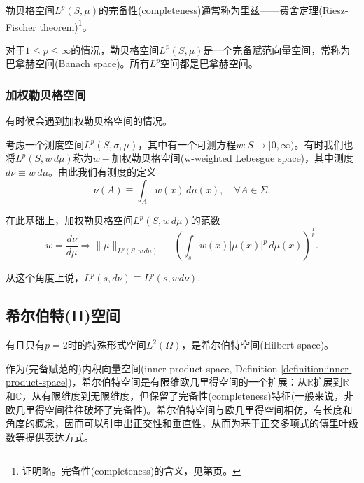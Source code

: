 勒贝格空间$L^{p}(S,\mu)$的完备性(completeness)通常称为里兹——费舍定理(Riesz-Fischer theorem)\footnote{证明略。完备性(completeness)的含义，见第\pageref{def:completeness-space}页。}。

对于$1 \le p \le \infty$的情况，勒贝格空间$L^{p}(S,\mu)$是一个完备赋范向量空间，常称为巴拿赫空间(Banach space)。所有$L^{p}$空间都是巴拿赫空间。

\subsubsection{加权勒贝格空间}
\label{sec:lp-weightd-lp}
有时候会遇到加权勒贝格空间的情况。

\begin{definition}[加权勒贝格空间]
  \label{definition:lp-weightd-lp}
  考虑一个测度空间$L^p \left( S, \sigma, \mu \right)$，其中有一个可测方程$w : S \rightarrow [ 0, \infty)$。有时我们也将$L^p \left(S, w \, d \mu \right)$称为$w-$加权勒贝格空间(w-weighted Lebesgue space)，其中测度$d \nu \equiv w \, d \mu$。由此我们有测度的定义
  \begin{equation*}
    \nu (A) \equiv \int_A w(x) \, d \mu(x), \quad \forall A \in \Sigma.
  \end{equation*}

在此基础上，加权勒贝格空间$L^p \left(S, w \, d \mu \right)$的范数
\begin{equation*}
  w = \frac{d \nu}{d \mu} \Rightarrow \Big\| \mu \Big\|_{L^p(S, w \, d\mu)} \equiv \left(
  \int_s w(x) \left| \mu(x) \right|^p \, d \mu(x)
  \right)^{\frac{1}{p}}.
\end{equation*}

从这个角度上说，$L^p (s, d \nu) \equiv L^p ( s, w d\nu)$.
\end{definition}

\subsection{希尔伯特(H)空间}
\label{sec:lp-hilbert-space}
有且只有$p=2$时的特殊形式空间$L^2(\Omega)$，是希尔伯特空间(Hilbert space)。

作为(完备赋范的)内积向量空间(inner product space, Definition \ref{definition:inner-product-space})，希尔伯特空间是有限维欧几里得空间的一个扩展：从$\mathbb{R}$扩展到$\mathbb{R}$和$\mathbb{C}$，从有限维度到无限维度，但保留了完备性(completeness)特征(一般来说，非欧几里得空间往往破坏了完备性)。希尔伯特空间与欧几里得空间相仿，有长度和角度的概念，因而可以引申出正交性和垂直性，从而为基于正交多项式的傅里叶级数等提供表达方式。

